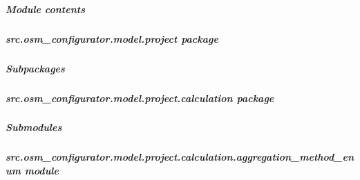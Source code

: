 \documentclass[letterpaper,10pt,english]{sphinxmanual}
\begin{document}
\subparagraph{Module contents}
\label{\detokenize{apidoc/src.osm_configurator.model.parser:module-src.osm_configurator.model.parser}}\label{\detokenize{apidoc/src.osm_configurator.model.parser:module-contents}}
\sphinxstepscope


\subparagraph{src.osm\_configurator.model.project package}
\label{\detokenize{apidoc/src.osm_configurator.model.project:src-osm-configurator-model-project-package}}\label{\detokenize{apidoc/src.osm_configurator.model.project::doc}}

\subparagraph{Subpackages}
\label{\detokenize{apidoc/src.osm_configurator.model.project:subpackages}}
\sphinxstepscope


\subparagraph{src.osm\_configurator.model.project.calculation package}
\label{\detokenize{apidoc/src.osm_configurator.model.project.calculation:src-osm-configurator-model-project-calculation-package}}\label{\detokenize{apidoc/src.osm_configurator.model.project.calculation::doc}}

\subparagraph{Submodules}
\label{\detokenize{apidoc/src.osm_configurator.model.project.calculation:submodules}}

\subparagraph{src.osm\_configurator.model.project.calculation.aggregation\_method\_enum module}
\label{\detokenize{apidoc/src.osm_configurator.model.project.calculation:module-src.osm_configurator.model.project.calculation.aggregation_method_enum}}\label{\detokenize{apidoc/src.osm_configurator.model.project.calculation:src-osm-configurator-model-project-calculation-aggregation-method-enum-module}}
\end{document}
